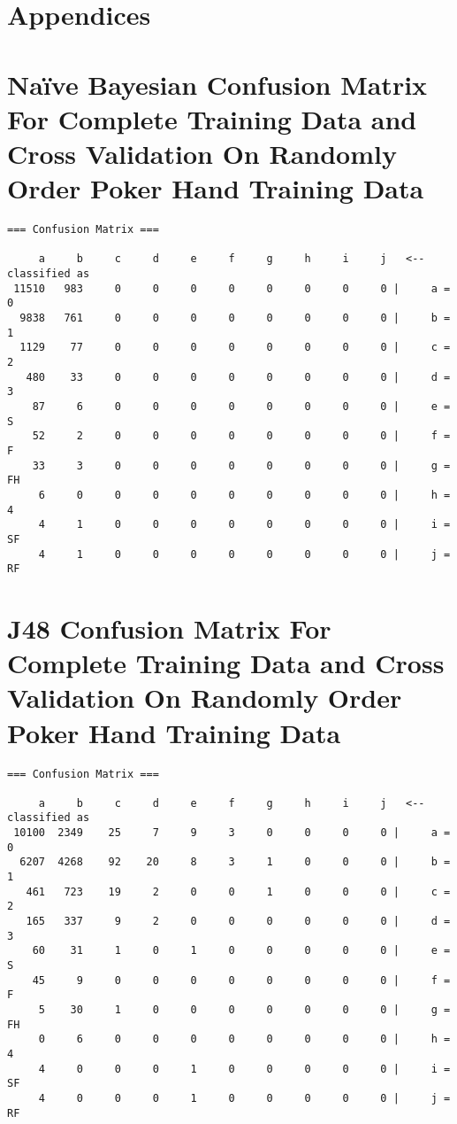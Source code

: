 \documentclass[11pt, a4paper]{article}
\begin{document}


\appendix

\section*{Appendices}

\section{Na\"ive Bayesian Confusion Matrix For Complete Training Data and Cross Validation On Randomly Order Poker Hand Training Data}

\begin{verbatim}
=== Confusion Matrix ===

     a     b     c     d     e     f     g     h     i     j   <-- classified as
 11510   983     0     0     0     0     0     0     0     0 |     a = 0
  9838   761     0     0     0     0     0     0     0     0 |     b = 1
  1129    77     0     0     0     0     0     0     0     0 |     c = 2
   480    33     0     0     0     0     0     0     0     0 |     d = 3
    87     6     0     0     0     0     0     0     0     0 |     e = S
    52     2     0     0     0     0     0     0     0     0 |     f = F
    33     3     0     0     0     0     0     0     0     0 |     g = FH
     6     0     0     0     0     0     0     0     0     0 |     h = 4
     4     1     0     0     0     0     0     0     0     0 |     i = SF
     4     1     0     0     0     0     0     0     0     0 |     j = RF
\end{verbatim}

\section{J48 Confusion Matrix For Complete Training Data and Cross Validation On Randomly Order Poker Hand Training Data}

\begin{verbatim}
=== Confusion Matrix ===

     a     b     c     d     e     f     g     h     i     j   <-- classified as
 10100  2349    25     7     9     3     0     0     0     0 |     a = 0
  6207  4268    92    20     8     3     1     0     0     0 |     b = 1
   461   723    19     2     0     0     1     0     0     0 |     c = 2
   165   337     9     2     0     0     0     0     0     0 |     d = 3
    60    31     1     0     1     0     0     0     0     0 |     e = S
    45     9     0     0     0     0     0     0     0     0 |     f = F
     5    30     1     0     0     0     0     0     0     0 |     g = FH
     0     6     0     0     0     0     0     0     0     0 |     h = 4
     4     0     0     0     1     0     0     0     0     0 |     i = SF
     4     0     0     0     1     0     0     0     0     0 |     j = RF
\end{verbatim}
\end{document}
